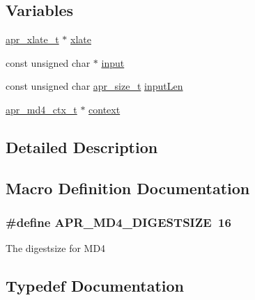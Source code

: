 \subsection*{Variables}
\begin{DoxyCompactItemize}
\item 
\hyperlink{group__APR__XLATE_ga069dabbadc30e3a4157c38104a250e77}{apr\+\_\+xlate\+\_\+t} $\ast$ \hyperlink{group__APR__Util__MD4_gaed437fe94bba952b62c87a7e00e337e9}{xlate}
\item 
const unsigned char $\ast$ \hyperlink{group__APR__Util__MD4_ga129cf63441c4f73a88c407736149a69e}{input}
\item 
const unsigned char \hyperlink{group__apr__platform_gaaa72b2253f6f3032cefea5712a27540e}{apr\+\_\+size\+\_\+t} \hyperlink{group__APR__Util__MD4_ga81003063f7c6b562141235dc37ade97e}{input\+Len}
\item 
\hyperlink{structapr__md4__ctx__t}{apr\+\_\+md4\+\_\+ctx\+\_\+t} $\ast$ \hyperlink{group__APR__Util__MD4_gaeac02e33573dc2faee64ed16e402da2d}{context}
\end{DoxyCompactItemize}


\subsection{Detailed Description}


\subsection{Macro Definition Documentation}
\subsubsection[{\texorpdfstring{A\+P\+R\+\_\+\+M\+D4\+\_\+\+D\+I\+G\+E\+S\+T\+S\+I\+ZE}{APR_MD4_DIGESTSIZE}}]{\setlength{\rightskip}{0pt plus 5cm}\#define A\+P\+R\+\_\+\+M\+D4\+\_\+\+D\+I\+G\+E\+S\+T\+S\+I\+ZE~16}\hypertarget{group__APR__Util__MD4_ga84489272090a11902d831c288c81c20f}{}\label{group__APR__Util__MD4_ga84489272090a11902d831c288c81c20f}
The digestsize for M\+D4 

\subsection{Typedef Documentation}
